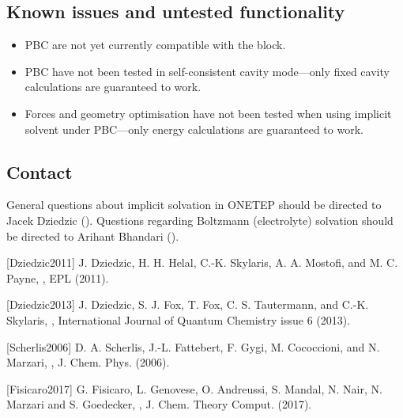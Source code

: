\documentclass[letterpaper,10pt,english]{sphinxmanual}
\begin{document}
\subsection{Known issues and untested functionality}
\label{\detokenize{implicit_solvation_v3:known-issues-and-untested-functionality}}\begin{itemize}
\item {} 
PBC are not yet currently compatible with the
 block.

\item {} 
PBC have not been tested in self-consistent cavity mode—only fixed
cavity calculations are guaranteed to work.

\item {} 
Forces and geometry optimisation have not been tested when using
implicit solvent under PBC—only energy calculations are guaranteed to
work.

\end{itemize}


\subsection{Contact}
\label{\detokenize{implicit_solvation_v3:contact}}
General questions about implicit solvation in ONETEP should be directed
to Jacek Dziedzic (). Questions regarding
Boltzmann (electrolyte) solvation should be directed to Arihant Bhandari
().

{[}Dziedzic2011{]} J. Dziedzic, H. H. Helal, C.-K. Skylaris, A. A. Mostofi, and M. C. Payne, , EPL  (2011).

{[}Dziedzic2013{]} J. Dziedzic, S. J. Fox, T. Fox, C. S. Tautermann, and C.-K. Skylaris, , International Journal of Quantum Chemistry  issue 6 (2013).

{[}Scherlis2006{]} D. A. Scherlis, J.-L. Fattebert, F. Gygi, M. Cococcioni, and N. Marzari, , J. Chem. Phys.  (2006).

{[}Fisicaro2017{]} G. Fisicaro, L. Genovese, O. Andreussi, S. Mandal, N. Nair, N. Marzari and S. Goedecker, , J. Chem. Theory Comput.  (2017).
\end{document}

